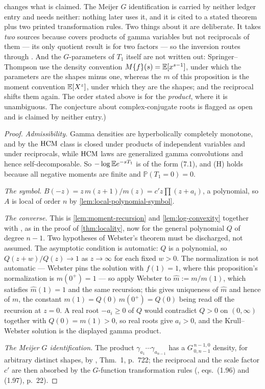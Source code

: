 \begin{proposition}
{changes what is claimed. The Meijer $G$ identification is carried by neither ledger entry and
needs neither: nothing later uses it, and it is cited to a stated theorem plus two printed
transformation rules. Two things about it are deliberate. It takes \emph{two} sources
because  covers products of gamma variables but not
reciprocals of them --- its only quotient result is for two factors --- so the inversion
routes through . And the $G$-parameters of $T_1$ itself are not
written out: Springer--Thompson use the density convention
$M\{f\}(s) = \mathbb{E}[x^{s-1}]$, under which the parameters are the shapes minus one, whereas the
$m$ of this proposition is the moment convention $\mathbb{E}[X^{z}]$, under which they are the shapes;
and the reciprocal shifts them again. The order stated above is for the \emph{product}, where
it is unambiguous. The conjecture about complex-conjugate roots is flagged as open and is
claimed by neither entry.)}
\end{proposition}

\begin{proof}
\emph{Admissibility.} Gamma densities are hyperbolically completely monotone, and by
 the $\mathrm{HCM}$ class is closed under products of independent variables and under
reciprocals, while $\mathrm{HCM}$ laws are generalized gamma convolutions and hence self-decomposable.
So $-\log \mathbb{E} e^{-sT_1}$ is of the form (7.1), and (H) holds because all negative moments are
finite and $\mathbb{P}(T_1 = 0) = 0$.

\emph{The symbol.} $B(-z) = z\,m(z+1)/m(z) = c'z\prod(z+a_i)$, a polynomial, so $A$ is local
of order $n$ by \ref{lem:local-polynomial-symbol}.

\emph{The converse.} This is \ref{lem:moment-recursion} and \ref{lem:log-convexity} together
with , as in the proof of \ref{thm:locality}, now for the general polynomial $Q$ of
degree $n-1$. Two hypotheses of Webster's theorem must be discharged, not assumed. The
asymptotic condition is automatic: $Q$ is a polynomial, so $Q(z+w)/Q(z) \to 1$ as
$z \to \infty$ for each fixed $w > 0$. The normalization is not automatic --- Webster pins the
solution with $f(1) = 1$, where this proposition's normalization is $m(0^+) = 1$ --- so apply
Webster to $\hat m := m/m(1)$, which satisfies $\hat m(1) = 1$ and the same recursion; this
gives uniqueness of $\hat m$ and hence of $m$, the constant $m(1) = Q(0)\,m(0^+) = Q(0)$ being
read off the recursion at $z = 0$. A real root $-a_i \ge 0$ of $Q$
would contradict $Q > 0$ on $(0,\infty)$ together with $Q(0) = m(1) > 0$, so real roots give
$a_i > 0$, and the Krull--Webster solution is the displayed gamma product.

\emph{The Meijer $G$ identification.} The product $\gamma_{a_1}\cdots\gamma_{a_{n-1}}$ has a
$G^{\,n-1,0}_{\,0,n-1}$ density, for arbitrary distinct shapes, by
, Thm.~1, p.~722; the reciprocal and the scale factor $c'$ are
then absorbed by the $G$-function transformation rules (,
eqs.~(1.96) and (1.97), p.~22).
\end{proof}


